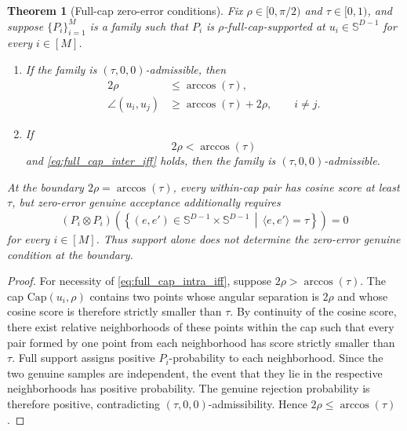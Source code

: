 \documentclass[journal]{IEEEtran}
\newtheorem{theorem}{Theorem}
\begin{document}
\begin{bibunit}
\begin{theorem}[Full-cap zero-error conditions]
\label{thm:full_cap_iff}
%
Fix $\rho\in[0,\pi/2)$ and $\tau\in[0,1)$, and suppose $\{P_i\}_{i=1}^M$ is a family such that $P_i$ is $\rho$-full-cap-supported at $u_i\in\mathbb S^{D-1}$ for every $i\in[M]$.
%
\begin{enumerate}
%
\item If the family is $(\tau,0,0)$-admissible, then
%
\begin{align}
2\rho &\le \arccos(\tau),
\label{eq:full_cap_intra_iff}\\
\angle(u_i,u_j) &\ge \arccos(\tau)+2\rho, \qquad i\ne j.
\label{eq:full_cap_inter_iff}
\end{align}
%
\item If
%
\begin{equation}
2\rho<\arccos(\tau)
\label{eq:full_cap_intra_suff}
\end{equation}
%
and \eqref{eq:full_cap_inter_iff} holds, then the family is $(\tau,0,0)$-admissible.
%
\end{enumerate}
%
At the boundary $2\rho=\arccos(\tau)$, every within-cap pair has cosine score at least $\tau$, but zero-error genuine acceptance additionally requires
%
\begin{equation}
(P_i\otimes P_i) \left( \left\{ (e,e')\in \mathbb S^{D-1}\times\mathbb S^{D-1} \,\middle|\,
\langle e,e'\rangle=\tau \right\} \right) =0
\end{equation}
%
for every $i\in[M]$. Thus support alone does not determine the zero-error genuine condition at the boundary.
%
\end{theorem}

\begin{proof}
%
For necessity of \eqref{eq:full_cap_intra_iff}, suppose $2\rho>\arccos(\tau)$. The cap $\mathrm{Cap}(u_i,\rho)$ contains two points whose angular separation is $2\rho$ and whose cosine score is therefore strictly smaller than $\tau$. By continuity of the cosine score, there exist relative neighborhoods of these points within the cap such that every pair formed by one point from each neighborhood has score strictly smaller than $\tau$. Full support assigns positive $P_i$-probability to each neighborhood. Since the two genuine samples are independent, the event that they lie in the respective neighborhoods has positive probability. The genuine rejection probability is therefore positive, contradicting $(\tau,0,0)$-admissibility. Hence $2\rho\le\arccos(\tau)$.


\end{proof}
\end{bibunit}
\end{document}
